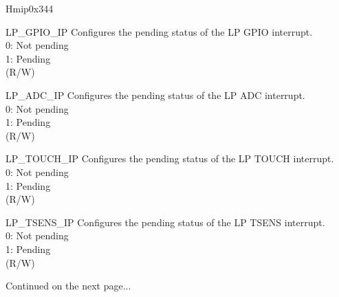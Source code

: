 \begin{register}{H}{mip}{0x344}
\begin{regdesc}
\begin{reglist}
\label{fielddesc:LPMIPGPIOIP}\item [LP\_GPIO\_IP] Configures the pending status of the LP GPIO interrupt.\\
0: Not pending\\
1: Pending \\(R/W)
\label{fielddesc:LPMIPADCIP}\item [LP\_ADC\_IP] Configures the pending status of the LP ADC interrupt.\\
0: Not pending\\
1: Pending \\(R/W)
\label{fielddesc:LPMIPTOUCHIP}\item [LP\_TOUCH\_IP] Configures the pending status of the LP TOUCH interrupt.\\
0: Not pending\\
1: Pending \\(R/W)
\label{fielddesc:LPMIPTSENSIP}\item [LP\_TSENS\_IP] Configures the pending status of the LP TSENS interrupt.\\
0: Not pending\\
1: Pending \\(R/W)
\item [Continued on the next page...]
\end{reglist}\end{regdesc}
\end{register}
\addtocounter{Regfloat}{-1}
